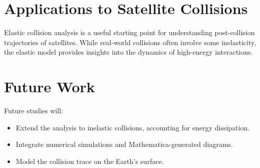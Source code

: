 \documentclass[12pt]{article}
\begin{document}
\section{Applications to Satellite Collisions}
Elastic collision analysis is a useful starting point for understanding post-collision trajectories of satellites. While real-world collisions often involve some inelasticity, the elastic model provides insights into the dynamics of high-energy interactions.

\section{Future Work}
Future studies will:
\begin{itemize}
    \item Extend the analysis to inelastic collisions, accounting for energy dissipation.
    \item Integrate numerical simulations and Mathematica-generated diagrams.
    \item Model the collision trace on the Earth's surface.
\end{itemize}
\end{document}
